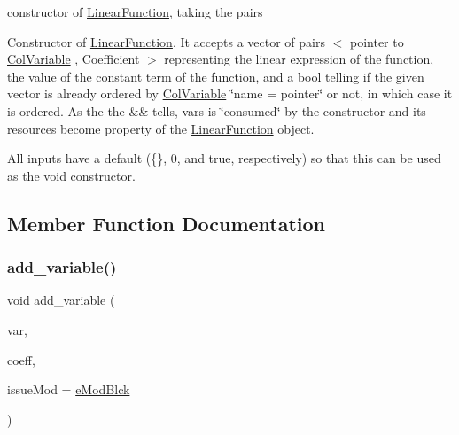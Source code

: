constructor of \mbox{\hyperlink{class_s_m_spp__di__unipi__it_1_1_linear_function}{Linear\+Function}}, taking the pairs 

Constructor of \mbox{\hyperlink{class_s_m_spp__di__unipi__it_1_1_linear_function}{Linear\+Function}}. It accepts a vector of pairs $<$ pointer to \mbox{\hyperlink{class_s_m_spp__di__unipi__it_1_1_col_variable}{Col\+Variable}} , Coefficient $>$ representing the linear expression of the function, the value of the constant term of the function, and a bool telling if the given vector is already ordered by \mbox{\hyperlink{class_s_m_spp__di__unipi__it_1_1_col_variable}{Col\+Variable}} \char`\"{}name = pointer\char`\"{} or not, in which case it is ordered. As the the \&\& tells, vars is \char`\"{}consumed\char`\"{} by the constructor and its resources become property of the \mbox{\hyperlink{class_s_m_spp__di__unipi__it_1_1_linear_function}{Linear\+Function}} object.

All inputs have a default (\{\}, 0, and true, respectively) so that this can be used as the void constructor. 

\subsection{Member Function Documentation}
\mbox{\label{class_s_m_spp__di__unipi__it_1_1_linear_function_a72d0d03fc72f08b2b29e30c07743a742}} 
\subsubsection{\texorpdfstring{add\+\_\+variable()}{add\_variable()}}
{\footnotesize\ttfamily void add\+\_\+variable (\begin{DoxyParamCaption}\item[{\mbox{\hyperlink{class_s_m_spp__di__unipi__it_1_1_col_variable}{Col\+Variable}} $\ast$const}]{var,  }\item[{const \mbox{\hyperlink{class_s_m_spp__di__unipi__it_1_1_linear_function_a1fa0f848dbb8d52dc62a1adfee1a1f90}{Coefficient}}}]{coeff,  }\item[{\mbox{\hyperlink{group___modification___t_y_p_e_s_ga544246d8c462e9a2d817c2c30797968f}{c\+\_\+\+Mod\+Param}}}]{issue\+Mod = {\ttfamily \mbox{\hyperlink{group___modification___t_y_p_e_s_gga48fddcdd03a03f49b7e389ca1ed938d4a21b14b26b1c0093a0905f6fc010bad29}{e\+Mod\+Blck}}} }\end{DoxyParamCaption})}



